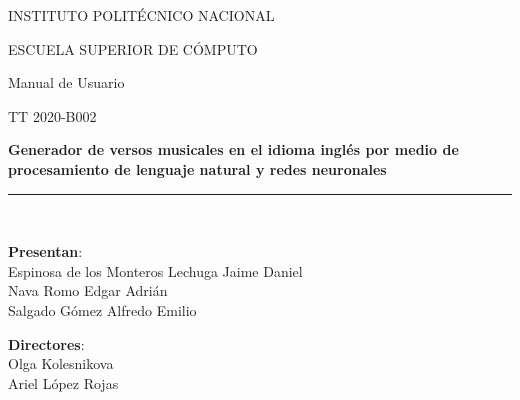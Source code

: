\documentclass[12pt, a4paper, titlepage]{article}
\begin{document}
\begin{titlepage}
		\vspace*{.25cm}								%
		
		\begin{center}
			
			\begin{LARGE}
				\textcolor{guindapoli}{INSTITUTO POLITÉCNICO NACIONAL}\\
			\end{LARGE}	
			
			\vspace*{0.2in}
			
			\begin{Large}
				\textcolor{azulescom}{ESCUELA SUPERIOR DE CÓMPUTO}\\
			\end{Large}	
		
			\vspace*{0.4in}
			
			\begin{large}
				Manual de Usuario\\
			\end{large}	
			
			\vspace*{0.4in}
			
			\begin{large}
			TT 2020-B002\\
			\end{large}
			
			\vspace*{0.2in}
			
			\begin{Large}
				\textbf{Generador de versos musicales en el idioma
					inglés por medio de procesamiento de lenguaje
					natural y redes neuronales}\\
			\end{Large}
						
			\vspace*{0.2in}
			
			\rule{80mm}{.1mm}\\
			\vspace*{0.1in}
			
			\begin{large}
				\begin{center}
					\textbf{Presentan}:\\
					Espinosa de los Monteros Lechuga Jaime Daniel\\
					Nava Romo Edgar Adrián\\
					Salgado Gómez Alfredo Emilio\\
				\end{center}
			\end{large}
			
			\begin{large}
				\textbf{Directores}:\\
				Olga Kolesnikova\\
				Ariel López Rojas\\
			\end{large}
			
		\end{center}
		
	\end{titlepage}
	
\end{document}
